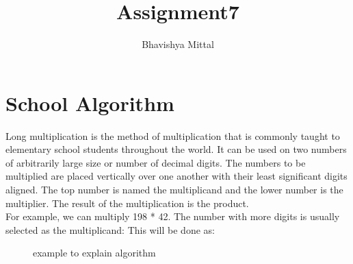 \documentclass[a4paper,11pt,oneside]{article}
\author{Bhavishya Mittal}
\title{Assignment7}
\begin{document}
\maketitle
\newpage

\section*{School Algorithm}
Long multiplication is the method of multiplication that is commonly taught to elementary school students 
throughout the world. It can be used on two numbers of arbitrarily large size or number of decimal digits. 
The numbers to be multiplied are placed vertically over one another with their least significant digits aligned. 
The top number is named the multiplicand and the lower number is the multiplier. The result of the 
multiplication is the product.\\

For example, we can multiply 198 * 42. 
The number with more digits is usually selected as the multiplicand: 
This will be done as:\\

\begin{figure}[!h]
\caption{example to explain algorithm}
\end{figure}
\end{document}
